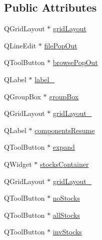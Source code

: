 \subsection*{Public Attributes}
\begin{DoxyCompactItemize}
\item 
Q\+Grid\+Layout $\ast$ \mbox{\hyperlink{class_ui___merge_population_plugin_component_adef42023accab2934c0631b15316eed5}{grid\+Layout}}
\item 
Q\+Line\+Edit $\ast$ \mbox{\hyperlink{class_ui___merge_population_plugin_component_aebc58458f35887b47448821a3058804b}{file\+Pop\+Out}}
\item 
Q\+Tool\+Button $\ast$ \mbox{\hyperlink{class_ui___merge_population_plugin_component_a2f07d6cda5afbd8ec0dea28d428932da}{browse\+Pop\+Out}}
\item 
Q\+Label $\ast$ \mbox{\hyperlink{class_ui___merge_population_plugin_component_a8e835f9dfb8aa5b9fb347ff76a5f9235}{label\+\_}}
\item 
Q\+Group\+Box $\ast$ \mbox{\hyperlink{class_ui___merge_population_plugin_component_a4083acdc6a15f2412405dea90dd7f9d6}{group\+Box}}
\item 
Q\+Grid\+Layout $\ast$ \mbox{\hyperlink{class_ui___merge_population_plugin_component_ac3ce0c9fe15c33470a55a57cf0fdad83}{grid\+Layout\+\_}}
\item 
Q\+Label $\ast$ \mbox{\hyperlink{class_ui___merge_population_plugin_component_a6fdc6857b37d78d4a13205842ffade17}{components\+Resume}}
\item 
Q\+Tool\+Button $\ast$ \mbox{\hyperlink{class_ui___merge_population_plugin_component_a4c7d812e634dd3e70500aef08a53fce6}{expand}}
\item 
Q\+Widget $\ast$ \mbox{\hyperlink{class_ui___merge_population_plugin_component_ac6045f671c6346fac27d654669d670ed}{stocks\+Container}}
\item 
Q\+Grid\+Layout $\ast$ \mbox{\hyperlink{class_ui___merge_population_plugin_component_af3a6ede00ea3e92c89c51c5c8f7480b4}{grid\+Layout\+\_}}
\item 
Q\+Tool\+Button $\ast$ \mbox{\hyperlink{class_ui___merge_population_plugin_component_a0f3a0c55fcaf139c55e7e1a4da9185d8}{no\+Stocks}}
\item 
Q\+Tool\+Button $\ast$ \mbox{\hyperlink{class_ui___merge_population_plugin_component_a550a4ac9f52426ba003cc5a2884cb924}{all\+Stocks}}
\item 
Q\+Tool\+Button $\ast$ \mbox{\hyperlink{class_ui___merge_population_plugin_component_a827e1a9df0516024b037038b12aa972a}{inv\+Stocks}}

\end{DoxyCompactItemize}

